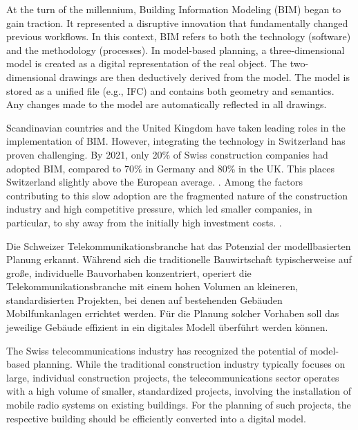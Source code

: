 \begin{English}
    At the turn of the millennium, Building Information Modeling (BIM) began to gain traction. It represented a disruptive innovation that fundamentally changed previous workflows. In this context, BIM refers to both the technology (software) and the methodology (processes). In model-based planning, a three-dimensional model is created as a digital representation of the real object. The two-dimensional drawings are then deductively derived from the model. The model is stored as a unified file (e.g., IFC) and contains both geometry and semantics. Any changes made to the model are automatically reflected in all drawings.

    Scandinavian countries and the United Kingdom have taken leading roles in the implementation of BIM. However, integrating the technology in Switzerland has proven challenging. By 2021, only 20\% of Swiss construction companies had adopted BIM, compared to 70\% in Germany and 80\% in the UK. This places Switzerland slightly above the European average. \cite{heinrichSchweizImBIMEuropavergleich2022}. Among the factors contributing to this slow adoption are the fragmented nature of the construction industry and high competitive pressure, which led smaller companies, in particular, to shy away from the initially high investment costs. \cite{ivanicErfolgreicheEinfuehrungBuilding2020}. \
\end{English}

\begin{German}
    Die Schweizer Telekommunikationsbranche hat das Potenzial der modellbasierten Planung erkannt. Während sich die traditionelle Bauwirtschaft typischerweise auf große, individuelle Bauvorhaben konzentriert, operiert die Telekommunikationsbranche mit einem hohen Volumen an kleineren, standardisierten Projekten, bei denen auf bestehenden Gebäuden Mobilfunkanlagen errichtet werden. Für die Planung solcher Vorhaben soll das jeweilige Gebäude effizient in ein digitales Modell überführt werden können.
\end{German}

\begin{English}
    The Swiss telecommunications industry has recognized the potential of model-based planning. While the traditional construction industry typically focuses on large, individual construction projects, the telecommunications sector operates with a high volume of smaller, standardized projects, involving the installation of mobile radio systems on existing buildings. For the planning of such projects, the respective building should be efficiently converted into a digital model.
\end{English}

